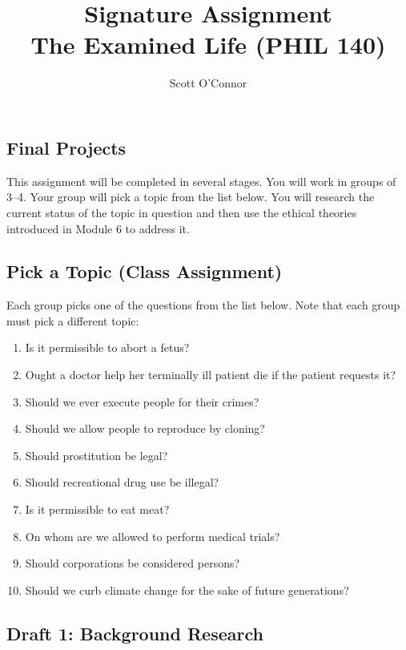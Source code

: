 \documentclass[10pt]{article}
\title{Signature Assignment \\ The Examined Life (PHIL 140)}
\author{Scott O’Connor}
\providecommand{\tightlist}{%
  \setlength{\itemsep}{0pt}\setlength{\parskip}{0pt}}
\begin{document}
\maketitle

\subsection{Final Projects}\label{final-projects}

This assignment will be completed in several stages. You will work in groups of 3--4.
Your group will pick a topic from the list below. You will research the
current status of the topic in question and then use the ethical
theories introduced in Module 6 to address it.

\subsection{Pick a Topic (Class
Assignment)}\label{pick-a-topic-class-assignment}

Each group picks one of the questions from the list below. Note that
each group must pick a different topic:

\begin{enumerate}
\def\labelenumi{\arabic{enumi}.}
\tightlist
\item
  Is it permissible to abort a fetus?
\item
  Ought a doctor help her terminally ill patient die if the patient
  requests it?
\item
  Should we ever execute people for their crimes?
\item
  Should we allow people to reproduce by cloning?
\item
  Should prostitution be legal?


\item
  Should recreational drug use be illegal?
\item
  Is it permissible to eat meat?
\item
  On whom are we allowed to perform medical trials?
\item
  Should corporations be considered persons?
\item
  Should we curb climate change for the sake of future generations?
\end{enumerate}

\subsection{Draft 1: Background
Research}\label{draft-1-background-research}
\end{document}
